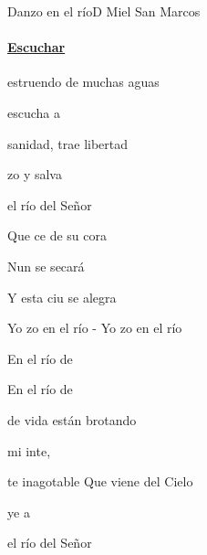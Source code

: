 \documentclass[12pt, spanish]{book}
\newcommand{\NotCCLIed}{\relax}
\begin{document}
    \begin{song}{Danzo en el río}{D}
    {} %
    {Miel San Marcos}
    {} %
    {} %
        \ifChordBk
        \paragraph{\mbox{}\hfill\protect\href{https://open.spotify.com/intl-es/track/0I3cmPOnNwgCOVtO6tfQsG}{Escuchar}\mbox{}\hfill}
        \fi


        \begin{SBOpGroup}
             estruendo de muchas aguas

             escucha a

             sanidad, trae libertad

            zo y salva
        \end{SBOpGroup}

        \begin{SBOpGroup}
             el río del Señor

            Que ce de su cora

            Nun se secará

            Y esta ciu se alegra
        \end{SBOpGroup}

        \begin{SBChorus}
            Yo zo en el río - Yo zo en el río

            En el río de  

            En el río de 
        \end{SBChorus}

        \begin{SBOpGroup}
             de vida están brotando

             mi inte,

            te inagotable Que viene del Cielo

            ye a
        \end{SBOpGroup}

        \begin{SBOpGroup}
             el río del Señor


\end{SBOpGroup}
\end{song}
\end{document}
